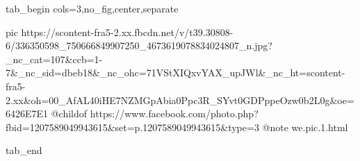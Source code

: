  
 
 
 
 


\ifcmt
  tab_begin cols=3,no_fig,center,separate

     pic https://scontent-fra5-2.xx.fbcdn.net/v/t39.30808-6/336350598_750666849907250_4673619078834024807_n.jpg?_nc_cat=107&ccb=1-7&_nc_sid=dbeb18&_nc_ohc=71VStXIQxvYAX_upJWl&_nc_ht=scontent-fra5-2.xx&oh=00_AfAL40iHE7NZMGpAbia0Ppc3R_SYvt0GDPppeOzw0b2L0g&oe=6426E7E1
		 @childof https://www.facebook.com/photo.php?fbid=1207589049943615&set=p.1207589049943615&type=3
		 @note we.pic.1.html

  tab_end
\fi

